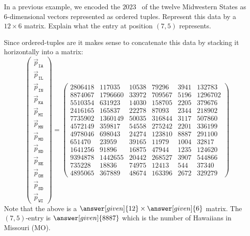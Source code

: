 \documentclass{ximera}
\begin{document}
\begin{example} %
  In a previous example, we encoded the $2023$
  ~of
  the twelve Midwestern States as $6$-dimensional vectors represented
  as ordered tuples. Represent this data by a $12\times 6$
  matrix. Explain what the entry at position $(7,5)$ represents.
  \begin{explanation}
  Since ordered-tuples are  it makes sense to
  concatenate this data by stacking it horizontally into a matrix:
  \[
  \begin{pmatrix}
  \vec{p}_{\texttt{IA}} \\
  \vec{p}_{\texttt{IL}} \\
  \vec{p}_{\texttt{IN}} \\
  \vec{p}_{\texttt{KA}} \\
  \vec{p}_{\texttt{MI}} \\
  \vec{p}_{\texttt{MN}} \\
  \vec{p}_{\texttt{MO}} \\
  \vec{p}_{\texttt{ND}} \\
  \vec{p}_{\texttt{NE}} \\
  \vec{p}_{\texttt{OH}} \\
  \vec{p}_{\texttt{SD}} \\
  \vec{p}_{\texttt{WI}}
  \end{pmatrix}
  =
  \begin{pmatrix}
  2806418 & 117035 & 10538 & 79296 & 3941 & 132783\\
  8874067 & 1796660 & 33972 & 709567 & 5196 & 1296702\\
  5510354 & 631923 & 14030 & 158705 & 2205 & 379676\\
  2416165 & 165837 & 22278 & 87093 & 2344 & 218902\\
  7735902 & 1360149 & 50035 & 316844 & 3117 & 507860\\
  4572149 & 359817 & 54558 & 275242 & 2201 & 336199\\
  4978046 & 698043 & 24274 & 123810 & 8887 & 291100\\
  651470 & 23959 & 39165 & 11979 & 1004 & 32817\\
  1641256 & 91896 & 16875 & 47944 & 1235 & 124620\\
  9394878 & 1442655 & 20442 & 268527 & 3907 & 544866\\
  735228 & 18836 & 74975 & 12413 & 544 & 37340\\
  4895065 & 367889 & 48674 & 163396 & 2672 & 329279
  \end{pmatrix}
  \]
  Note that the above is a $\answer[given]{12}\times \answer[given]{6}$ matrix. The $(7, 5)$-entry is
  $\answer[given]{8887}$ which is the number of Hawaiians in Missouri (MO).
  \end{explanation}
\end{example}
\end{document}
